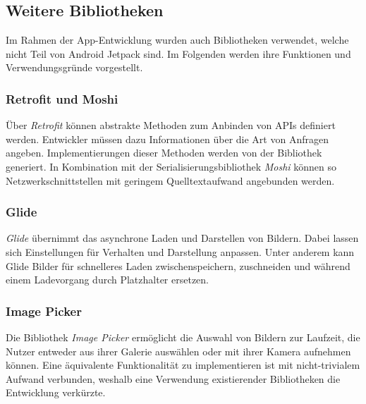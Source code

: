 \subsection{Weitere Bibliotheken}
\label{subsec:app:bibs}
Im Rahmen der App-Entwicklung wurden auch Bibliotheken verwendet, welche nicht Teil von Android Jetpack sind.
Im Folgenden werden ihre Funktionen und Verwendungsgründe vorgestellt.

\subsubsection{Retrofit und Moshi}
\label{subsubsec:app:bibs:retrofitmoshi}
Über \textit{Retrofit} können abstrakte Methoden zum Anbinden von APIs definiert werden.
Entwickler müssen dazu Informationen über die Art von Anfragen angeben.
Implementierungen dieser Methoden werden von der Bibliothek generiert.
In Kombination mit der Serialisierungsbibliothek \textit{Moshi} können so Netzwerkschnittstellen mit geringem Quelltextaufwand angebunden werden.

\subsubsection{Glide}
\label{subsubsec:app:bibs:glide}
\textit{Glide} übernimmt das asynchrone Laden und Darstellen von Bildern.
Dabei lassen sich Einstellungen für Verhalten und Darstellung anpassen.
Unter anderem kann Glide Bilder für schnelleres Laden zwischenspeichern, zuschneiden und während einem Ladevorgang durch Platzhalter ersetzen.

\subsubsection{Image Picker}
\label{subsubsec:app:bibs:imagepicker}
Die Bibliothek \textit{Image Picker} ermöglicht die Auswahl von Bildern zur Laufzeit, die Nutzer entweder aus ihrer Galerie auswählen oder mit ihrer Kamera aufnehmen können.
Eine äquivalente Funktionalität zu implementieren ist mit nicht-trivialem Aufwand verbunden, weshalb eine Verwendung existierender Bibliotheken die Entwicklung verkürzte.

